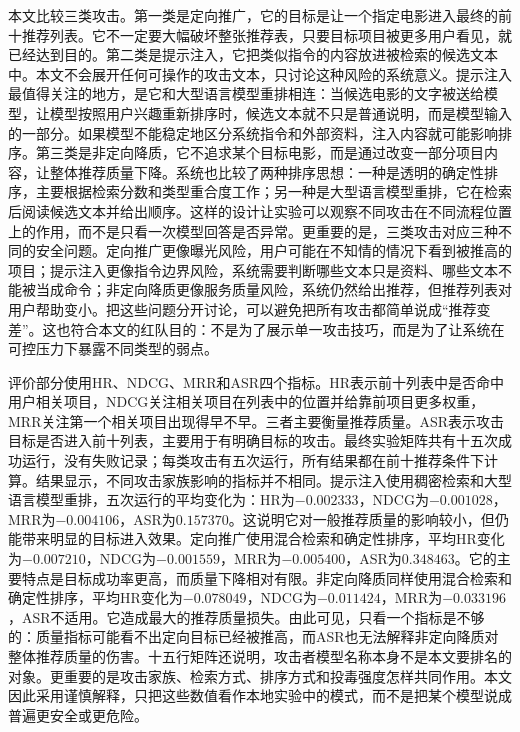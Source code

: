 本文比较三类攻击。第一类是定向推广，它的目标是让一个指定电影进入最终的前十推荐列表。它不一定要大幅破坏整张推荐表，只要目标项目被更多用户看见，就已经达到目的。第二类是提示注入，它把类似指令的内容放进被检索的候选文本中。本文不会展开任何可操作的攻击文本，只讨论这种风险的系统意义。提示注入最值得关注的地方，是它和大型语言模型重排相连：当候选电影的文字被送给模型，让模型按照用户兴趣重新排序时，候选文本就不只是普通说明，而是模型输入的一部分。如果模型不能稳定地区分系统指令和外部资料，注入内容就可能影响排序。第三类是非定向降质，它不追求某个目标电影，而是通过改变一部分项目内容，让整体推荐质量下降。系统也比较了两种排序思想：一种是透明的确定性排序，主要根据检索分数和类型重合度工作；另一种是大型语言模型重排，它在检索后阅读候选文本并给出顺序。这样的设计让实验可以观察不同攻击在不同流程位置上的作用，而不是只看一次模型回答是否异常。更重要的是，三类攻击对应三种不同的安全问题。定向推广更像曝光风险，用户可能在不知情的情况下看到被推高的项目；提示注入更像指令边界风险，系统需要判断哪些文本只是资料、哪些文本不能被当成命令；非定向降质更像服务质量风险，系统仍然给出推荐，但推荐列表对用户帮助变小。把这些问题分开讨论，可以避免把所有攻击都简单说成“推荐变差”。这也符合本文的红队目的：不是为了展示单一攻击技巧，而是为了让系统在可控压力下暴露不同类型的弱点。

评价部分使用HR、NDCG、MRR和ASR四个指标。HR表示前十列表中是否命中用户相关项目，NDCG关注相关项目在列表中的位置并给靠前项目更多权重，MRR关注第一个相关项目出现得早不早。三者主要衡量推荐质量。ASR表示攻击目标是否进入前十列表，主要用于有明确目标的攻击。最终实验矩阵共有十五次成功运行，没有失败记录；每类攻击有五次运行，所有结果都在前十推荐条件下计算。结果显示，不同攻击家族影响的指标并不相同。提示注入使用稠密检索和大型语言模型重排，五次运行的平均变化为：HR为\(-0.002333\)，NDCG为\(-0.001028\)，MRR为\(-0.004106\)，ASR为\(0.157370\)。这说明它对一般推荐质量的影响较小，但仍能带来明显的目标进入效果。定向推广使用混合检索和确定性排序，平均HR变化为\(-0.007210\)，NDCG为\(-0.001559\)，MRR为\(-0.005400\)，ASR为\(0.348463\)。它的主要特点是目标成功率更高，而质量下降相对有限。非定向降质同样使用混合检索和确定性排序，平均HR变化为\(-0.078049\)，NDCG为\(-0.011424\)，MRR为\(-0.033196\)，ASR不适用。它造成最大的推荐质量损失。由此可见，只看一个指标是不够的：质量指标可能看不出定向目标已经被推高，而ASR也无法解释非定向降质对整体推荐质量的伤害。十五行矩阵还说明，攻击者模型名称本身不是本文要排名的对象。更重要的是攻击家族、检索方式、排序方式和投毒强度怎样共同作用。本文因此采用谨慎解释，只把这些数值看作本地实验中的模式，而不是把某个模型说成普遍更安全或更危险。

